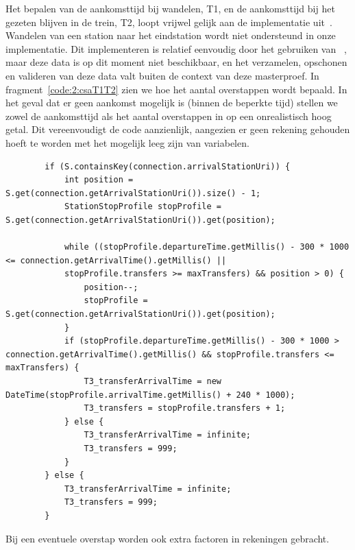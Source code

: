 Het bepalen van de aankomsttijd bij wandelen, T1, en de aankomsttijd bij het gezeten blijven in de trein, T2, loopt vrijwel gelijk aan de implementatie uit~\cite{strasser17}. Wandelen van een station naar het eindstation wordt niet ondersteund in onze implementatie. Dit implementeren is relatief eenvoudig door het gebruiken van ~\citep{strasser17,hannemann08}, maar deze data is op dit moment niet beschikbaar, en het verzamelen, opschonen en valideren van deze data valt buiten de context van deze masterproef. In fragment~\ref{code:2:csaT1T2} zien we hoe het aantal overstappen wordt bepaald. In het geval dat er geen aankomst mogelijk is (binnen de beperkte tijd) stellen we zowel de aankomsttijd als het aantal overstappen in op een onrealistisch hoog getal. Dit vereenvoudigt de code aanzienlijk, aangezien er geen rekening gehouden hoeft te worden met het mogelijk leeg zijn van variabelen.

\begin{listing}[htb]
	\begin{verbatim}
		if (S.containsKey(connection.arrivalStationUri)) {
			int position = S.get(connection.getArrivalStationUri()).size() - 1;
			StationStopProfile stopProfile = S.get(connection.getArrivalStationUri()).get(position);
			
			while ((stopProfile.departureTime.getMillis() - 300 * 1000 <= connection.getArrivalTime().getMillis() ||
			stopProfile.transfers >= maxTransfers) && position > 0) {
				position--;
				stopProfile = S.get(connection.getArrivalStationUri()).get(position);
			}
			if (stopProfile.departureTime.getMillis() - 300 * 1000 > connection.getArrivalTime().getMillis() && stopProfile.transfers <= maxTransfers) {
				T3_transferArrivalTime = new DateTime(stopProfile.arrivalTime.getMillis() + 240 * 1000);
				T3_transfers = stopProfile.transfers + 1;
			} else {
				T3_transferArrivalTime = infinite;
				T3_transfers = 999;
			}
		} else {
			T3_transferArrivalTime = infinite;
			T3_transfers = 999;
		}
		\end{verbatim}
		\caption[CSA: Bepalen van aankomsttijden]{Bij een eventuele overstap worden ook extra factoren in rekeningen gebracht.}
		\label{code:2:csaT3}
\end{listing}

